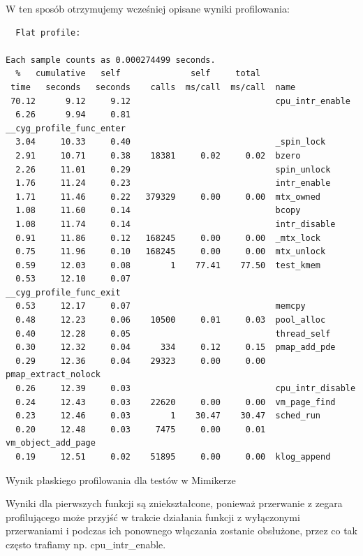 \documentclass[shortabstract]{iithesis}
\theoremstyle{definition} \newtheorem*{definition}{Definicja}
\theoremstyle{definition} \newtheorem*{example}{Przykład}
\theoremstyle{definition} \newtheorem*{remark}{Uwaga}
\newenvironment{longlisting}{\captionsetup{type=listing}}{}
\begin{document}
W ten sposób otrzymujemy wcześniej opisane wyniki profilowania:

\begin{longlisting}
  \begin{verbatim}
  Flat profile:

Each sample counts as 0.000274499 seconds.
  %   cumulative   self              self     total           
 time   seconds   seconds    calls  ms/call  ms/call  name    
 70.12      9.12     9.12                             cpu_intr_enable
  6.26      9.94     0.81                             __cyg_profile_func_enter
  3.04     10.33     0.40                             _spin_lock
  2.91     10.71     0.38    18381     0.02     0.02  bzero
  2.26     11.01     0.29                             spin_unlock
  1.76     11.24     0.23                             intr_enable
  1.71     11.46     0.22   379329     0.00     0.00  mtx_owned
  1.08     11.60     0.14                             bcopy
  1.08     11.74     0.14                             intr_disable
  0.91     11.86     0.12   168245     0.00     0.00  _mtx_lock
  0.75     11.96     0.10   168245     0.00     0.00  mtx_unlock
  0.59     12.03     0.08        1    77.41    77.50  test_kmem
  0.53     12.10     0.07                             __cyg_profile_func_exit
  0.53     12.17     0.07                             memcpy
  0.48     12.23     0.06    10500     0.01     0.03  pool_alloc
  0.40     12.28     0.05                             thread_self
  0.30     12.32     0.04      334     0.12     0.15  pmap_add_pde
  0.29     12.36     0.04    29323     0.00     0.00  pmap_extract_nolock
  0.26     12.39     0.03                             cpu_intr_disable
  0.24     12.43     0.03    22620     0.00     0.00  vm_page_find
  0.23     12.46     0.03        1    30.47    30.47  sched_run
  0.20     12.48     0.03     7475     0.00     0.01  vm_object_add_page
  0.19     12.51     0.02    51895     0.00     0.00  klog_append
  \end{verbatim}
  \caption{Wynik płaskiego profilowania dla testów w Mimikerze}
  \label{lst:flatprofmimiker}
\end{longlisting}

Wyniki dla pierwszych funkcji są zniekształcone, ponieważ przerwanie z zegara profilującego może przyjść w trakcie działania funkcji z wyłączonymi przerwaniami i podczas ich ponownego włączania zostanie obsłużone, przez co tak często trafiamy np. cpu\_intr\_enable.
\end{document}
